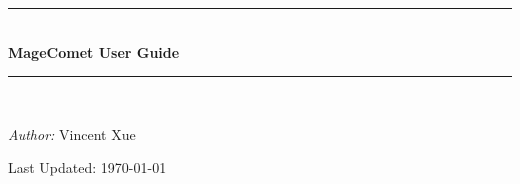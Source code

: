 \newcommand{\HRule}{\rule{\linewidth}{0.5mm}}

\begin{titlepage}
\begin{center}



%

\HRule \\[1cm]
{ \huge \bfseries MageComet User Guide}\\[0.4cm]

\HRule \\[1.5cm]

\begin{center}
\large

\emph{Author:}
Vincent Xue
\end{center}

\vfill

\large Last Updated: { \today}

\end{center}

\end{titlepage}
